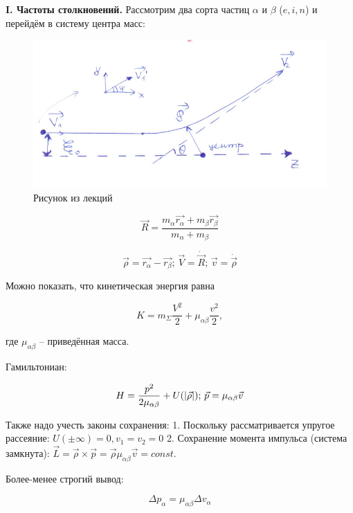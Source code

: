 \documentclass[10pt, a4paper]{article}
\numberwithin{equation}{section}
\begin{document}
{\bfseries \large I. Частоты столкновений.} Рассмотрим два сорта частиц $\alpha$ и $\beta$ ($e, i, n$) и перейдём в систему центра масс:

\begin{figure}[h!]
	\begin{center}
		\includegraphics[width=0.6\linewidth]{scattering_simple.pdf}
	\end{center}
	\caption{Рисунок из лекций}
	\label{fig:scattering}
\end{figure}

\begin{equation} \label{eq:center_mass}
	\vec{R} = \frac{m_\alpha\vec{r_\alpha}+m_\beta\vec{r_\beta}}{m_\alpha+m_\beta}
\end{equation}

\begin{equation*}
	\vec{\rho} = \vec{r_\alpha}-\vec{r_\beta};\,
	\vec{V} = \dot{\vec{R}};\,
	\vec{v} = \dot{\vec{\rho}}
\end{equation*}

Можно показать, что кинетическая энергия равна

\begin{equation*}
	K = m_\Sigma\frac{V^2}{2}+\mu_{\alpha\beta}\frac{v^2}{2},
\end{equation*}

где $\mu_{\alpha\beta}$ -- приведённая масса. 

Гамильтониан:

\begin{equation*}
	H = \frac{p^2}{2\mu_{\alpha\beta}}+U(\abs{\vec{\rho}});\,
	\vec{p} = \mu_{\alpha\beta}\vec{v}
\end{equation*}

Также надо учесть законы сохранения: 1. Поскольку рассматривается упругое рассеяние: $U(\pm \infty) = 0, v_1 = v_2 = 0$ 2. Сохранение момента импульса (система замкнута): $\vec{L} = \vec{\rho} \times \vec{p} = \vec{\rho} \mu_{\alpha\beta} \vec{v} = const$.

Более-менее строгий вывод:

\begin{equation*}
	\Delta p_\alpha = \mu_{\alpha\beta} \Delta v_\alpha
\end{equation*}
\end{document}

